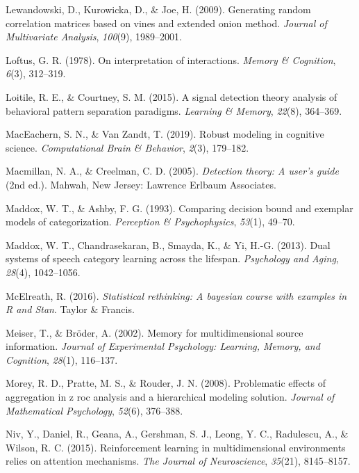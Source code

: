 \documentclass[
  english,
  ,man,floatsintext]{apa6}
\begin{document}
\leavevmode\hypertarget{ref-lewandowski2009generating}{}%
Lewandowski, D., Kurowicka, D., \& Joe, H. (2009). Generating random correlation matrices based on vines and extended onion method. \emph{Journal of Multivariate Analysis}, \emph{100}(9), 1989--2001.

\leavevmode\hypertarget{ref-Loftus1978}{}%
Loftus, G. R. (1978). On interpretation of interactions. \emph{Memory \& Cognition}, \emph{6}(3), 312--319.

\leavevmode\hypertarget{ref-LoitileAndCourtney2015}{}%
Loitile, R. E., \& Courtney, S. M. (2015). A signal detection theory analysis of behavioral pattern separation paradigms. \emph{Learning \& Memory}, \emph{22}(8), 364--369.

\leavevmode\hypertarget{ref-MacEachernAndVanZandt2019}{}%
MacEachern, S. N., \& Van Zandt, T. (2019). Robust modeling in cognitive science. \emph{Computational Brain \& Behavior}, \emph{2}(3), 179--182.

\leavevmode\hypertarget{ref-MacmillanAndCreelman2005}{}%
Macmillan, N. A., \& Creelman, C. D. (2005). \emph{Detection theory: A user's guide} (2nd ed.). Mahwah, New Jersey: Lawrence Erlbaum Associates.

\leavevmode\hypertarget{ref-MaddoxAndAshby1993}{}%
Maddox, W. T., \& Ashby, F. G. (1993). Comparing decision bound and exemplar models of categorization. \emph{Perception \& Psychophysics}, \emph{53}(1), 49--70.

\leavevmode\hypertarget{ref-MaddoxEtAl2013}{}%
Maddox, W. T., Chandrasekaran, B., Smayda, K., \& Yi, H.-G. (2013). Dual systems of speech category learning across the lifespan. \emph{Psychology and Aging}, \emph{28}(4), 1042--1056.

\leavevmode\hypertarget{ref-McElreath2016}{}%
McElreath, R. (2016). \emph{Statistical rethinking: A bayesian course with examples in R and Stan}. Taylor \& Francis.

\leavevmode\hypertarget{ref-MeiserAndBroder2002}{}%
Meiser, T., \& Bröder, A. (2002). Memory for multidimensional source information. \emph{Journal of Experimental Psychology: Learning, Memory, and Cognition}, \emph{28}(1), 116--137.

\leavevmode\hypertarget{ref-morey2008problematic}{}%
Morey, R. D., Pratte, M. S., \& Rouder, J. N. (2008). Problematic effects of aggregation in z roc analysis and a hierarchical modeling solution. \emph{Journal of Mathematical Psychology}, \emph{52}(6), 376--388.

\leavevmode\hypertarget{ref-NivEtAl2015}{}%
Niv, Y., Daniel, R., Geana, A., Gershman, S. J., Leong, Y. C., Radulescu, A., \& Wilson, R. C. (2015). Reinforcement learning in multidimensional environments relies on attention mechanisms. \emph{The Journal of Neuroscience}, \emph{35}(21), 8145--8157.
\end{document}
